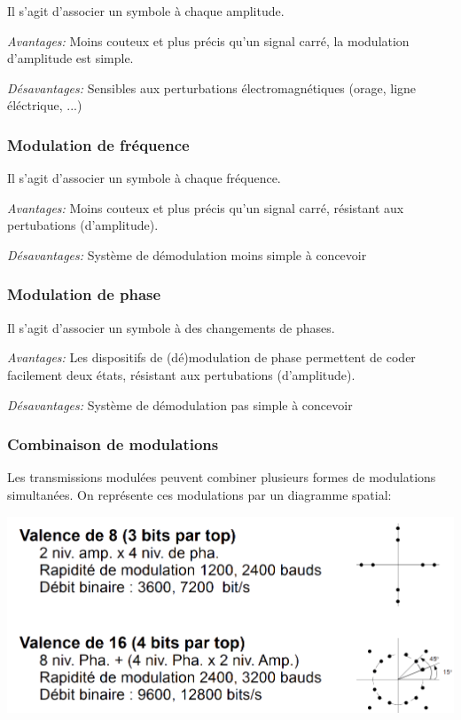 \documentclass[a4paper, 12pt, french]{article}
\begin{document}
	Il s'agit d'associer un symbole à chaque amplitude.

	\emph{Avantages:} Moins couteux et plus précis qu'un signal carré, la modulation d'amplitude est simple.
	
	\emph{Désavantages:} Sensibles aux perturbations électromagnétiques (orage, ligne éléctrique, ...)

	\subsubsection{Modulation de fréquence}

	Il s'agit d'associer un symbole à chaque fréquence.

	\emph{Avantages:} Moins couteux et plus précis qu'un signal carré, résistant aux pertubations (d'amplitude).
	
	\emph{Désavantages:} Système de démodulation moins simple à concevoir

	\subsubsection{Modulation de phase}

	Il s'agit d'associer un symbole à des changements de phases.

	\emph{Avantages:} Les dispositifs de (dé)modulation de phase permettent de coder facilement deux états, résistant aux pertubations (d'amplitude).
	
	\emph{Désavantages:} Système de démodulation pas simple à concevoir

	\subsubsection{Combinaison de modulations}

	Les transmissions modulées peuvent combiner plusieurs formes de modulations simultanées. On représente ces modulations par un diagramme spatial:

	\includegraphics[width=13.8cm]{reseau_diagramme_spatial}
\end{document}
